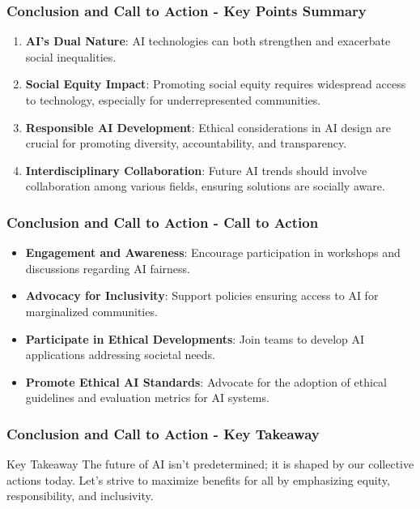 \documentclass[aspectratio=169]{beamer}
\begin{document}
\begin{frame}[fragile]
    \frametitle{Conclusion and Call to Action - Key Points Summary}
    \begin{enumerate}
        \item \textbf{AI's Dual Nature}: AI technologies can both strengthen and exacerbate social inequalities.
        \item \textbf{Social Equity Impact}: Promoting social equity requires widespread access to technology, especially for underrepresented communities.
        \item \textbf{Responsible AI Development}: Ethical considerations in AI design are crucial for promoting diversity, accountability, and transparency.
        \item \textbf{Interdisciplinary Collaboration}: Future AI trends should involve collaboration among various fields, ensuring solutions are socially aware.
    \end{enumerate}
\end{frame}

\begin{frame}[fragile]
    \frametitle{Conclusion and Call to Action - Call to Action}
    \begin{itemize}
        \item \textbf{Engagement and Awareness}: Encourage participation in workshops and discussions regarding AI fairness.
        \item \textbf{Advocacy for Inclusivity}: Support policies ensuring access to AI for marginalized communities.
        \item \textbf{Participate in Ethical Developments}: Join teams to develop AI applications addressing societal needs.
        \item \textbf{Promote Ethical AI Standards}: Advocate for the adoption of ethical guidelines and evaluation metrics for AI systems.
    \end{itemize}
\end{frame}

\begin{frame}[fragile]
    \frametitle{Conclusion and Call to Action - Key Takeaway}
    \begin{block}{Key Takeaway}
        The future of AI isn’t predetermined; it is shaped by our collective actions today. 
        Let’s strive to maximize benefits for all by emphasizing equity, responsibility, and inclusivity.
    \end{block}
\end{frame}
\end{document}
